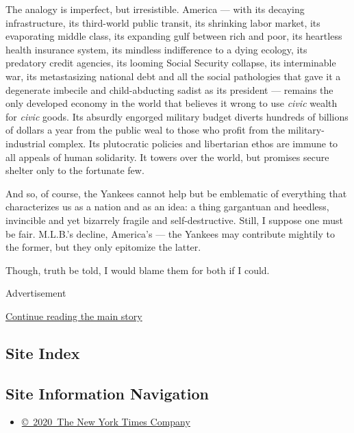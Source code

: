The analogy is imperfect, but irresistible. America --- with its
decaying infrastructure, its third-world public transit, its shrinking
labor market, its evaporating middle class, its expanding gulf between
rich and poor, its heartless health insurance system, its mindless
indifference to a dying ecology, its predatory credit agencies, its
looming Social Security collapse, its interminable war, its
metastasizing national debt and all the social pathologies that gave it
a degenerate imbecile and child-abducting sadist as its president ---
remains the only developed economy in the world that believes it wrong
to use \emph{civic} wealth for \emph{civic} goods. Its absurdly engorged
military budget diverts hundreds of billions of dollars a year from the
public weal to those who profit from the military-industrial complex.
Its plutocratic policies and libertarian ethos are immune to all appeals
of human solidarity. It towers over the world, but promises secure
shelter only to the fortunate few.

And so, of course, the Yankees cannot help but be emblematic of
everything that characterizes us as a nation and as an idea: a thing
gargantuan and heedless, invincible and yet bizarrely fragile and
self-destructive. Still, I suppose one must be fair. M.L.B.'s decline,
America's --- the Yankees may contribute mightily to the former, but
they only epitomize the latter.

Though, truth be told, I would blame them for both if I could.

Advertisement

\protect\hyperlink{after-bottom}{Continue reading the main story}

\hypertarget{site-index}{%
\subsection{Site Index}\label{site-index}}

\hypertarget{site-information-navigation}{%
\subsection{Site Information
Navigation}\label{site-information-navigation}}

\begin{itemize}
\tightlist
\item
  \href{https://help.nytimes3xbfgragh.onion/hc/en-us/articles/115014792127-Copyright-notice}{©~2020~The
  New York Times Company}
\end{itemize}

